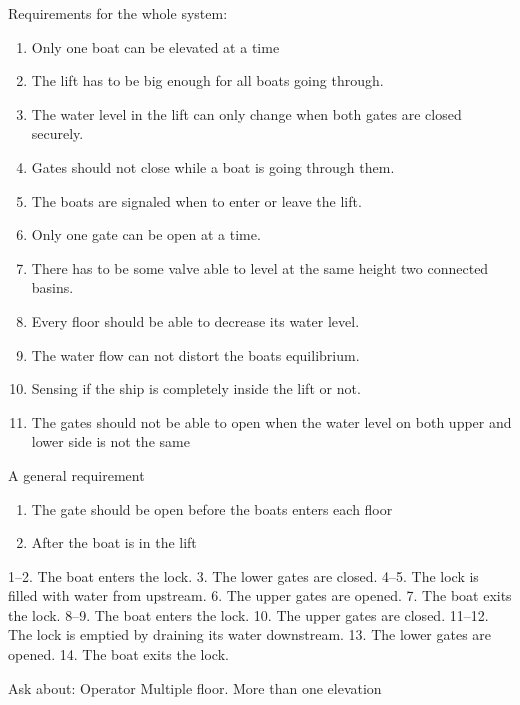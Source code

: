 \documentclass{article}
\begin{document}
Requirements for the whole system:
\begin{enumerate}
	\item Only one boat can be elevated at a time
	\item The lift has to be big enough for all boats going through.
	\item The water level in the lift can only change when both gates are closed securely.
	\item Gates should not close while a boat is going through them.
	\item The boats are signaled when to enter or leave the lift.
	\item Only one gate can be open at a time.
	\item There has to be some valve able to level at the same height two connected basins.
	\item Every floor should be able to decrease its water level.
	\item The water flow can not distort the boats equilibrium.
	\item Sensing if the ship is completely inside the lift or not.
	\item The gates should not be able to open when the water level on both upper and lower side is not the same
	
\end{enumerate}

A general requirement

\begin{enumerate}
	\item The gate should be open before the boats enters each floor
	\item After the boat is in the lift
\end{enumerate}

1–2. 	The boat enters the lock. 	
3. 		The lower gates are closed. 
4–5. 	The lock is filled with water from upstream. 	
6. 		The upper gates are opened. 	
7. 		The boat exits the lock. 	
8–9. 	The boat enters the lock.
10. 	The upper gates are closed.
11–12. 	The lock is emptied by draining its water downstream.
13. 	The lower gates are opened.
14. 	The boat exits the lock.
\pagebreak

Ask about:
Operator
Multiple floor.  More than one elevation 
\end{document}

